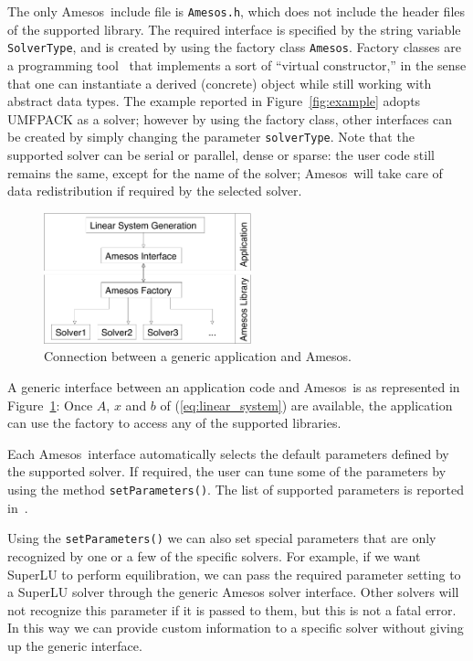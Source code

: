 \documentclass[acmtoms,acmnow]{acmtrans2m}
\newcommand{\amesos}{{\sc Amesos}}
\begin{document}
The only \amesos\ include file is \verb!Amesos.h!, which does not include the
header files of the supported library. The required interface is specified by
the string variable \verb!SolverType!, and is created by using the factory
class \verb!Amesos!. Factory classes are a programming
tool~\cite{alexandrescu01modern} that implements a sort of ``virtual
constructor,'' in the sense that one can instantiate a derived (concrete)
object while still working with abstract data types. The example reported in
Figure~\ref{fig:example} adopts UMFPACK as a solver; however by using the
factory class, other interfaces can be created by simply changing the
parameter {\tt solverType}. Note that the supported solver can be serial or
parallel, dense or sparse: the user code still remains the same, except for
the name of the solver; \amesos\ will take care of data redistribution if
required by the selected solver.

\begin{figure}
\begin{center}
\includegraphics[width=6cm]{amesos_and_application.pdf}
\end{center}
\caption{Connection between a generic application and \amesos.}
\label{fig:app}
\end{figure}

A generic interface between an application code and \amesos\ is as
represented in Figure~\ref{fig:app}: Once $A$, $x$ and $b$ of
(\ref{eq:linear_system}) are available, the application can use the
factory to access any of the supported libraries.

Each \amesos\ interface automatically selects the default parameters
defined by the supported solver. If required, the user can tune some
of the parameters by using the method \verb!setParameters()!. The
list of supported parameters is reported
in~\cite{Amesos-Reference-Guide}.

Using the \verb!setParameters()! we can also set special parameters
that are only recognized by one or a few of the specific solvers.
For example, if we want SuperLU to perform equilibration, we can
pass the required parameter setting to a SuperLU solver through the
generic Amesos solver interface.  Other solvers will not recognize
this parameter if it is passed to them, but this is not a fatal
error.  In this way we can provide custom information to a specific
solver without giving up the generic interface.
\end{document}

